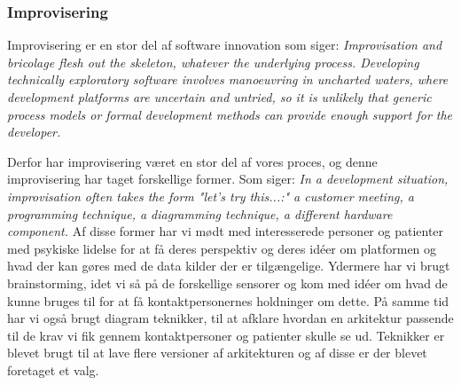 \subsubsection{Improvisering}
Improvisering er en stor del af software innovation som \citet[side 56]{book:softwareinnovation} siger: \textit{Improvisation and bricolage flesh out the skeleton, whatever the underlying process. Developing technically exploratory software involves manoeuvring in uncharted waters, where development platforms are uncertain and untried, so it is unlikely that generic process models or formal development methods can provide enough support for the developer.}

Derfor har improvisering været en stor del af vores proces, og denne improvisering har taget forskellige former.
Som \citet[side 56]{book:softwareinnovation} siger: \textit{In a development situation, improvisation often takes the form "let's try this...:" a customer meeting, a programming technique, a diagramming technique, a different hardware component.}
Af disse former har vi mødt med interesserede personer og patienter med psykiske lidelse for at få deres perspektiv og deres idéer om platformen og hvad der kan gøres med de data kilder der er tilgængelige. 
Ydermere har vi brugt brainstorming, idet vi så på de forskellige sensorer og kom med idéer om hvad de kunne bruges til for at få kontaktpersonernes holdninger om dette.
På samme tid har vi også brugt diagram teknikker, til at afklare hvordan en arkitektur passende til de krav vi fik gennem kontaktpersoner og patienter skulle se ud.
Teknikker er blevet brugt til at lave flere versioner af arkitekturen og af disse er der blevet foretaget et valg.
